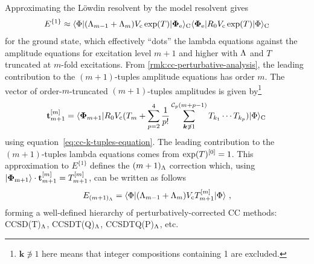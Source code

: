 \documentclass[11pt]{article}
\numberwithin{equation}{section}
\begin{document}
\begin{ex}
Approximating the L\"owdin resolvent by the model resolvent gives
\begin{align}
  E^{\{1\}}
\approx
  \langle\Phi |(\Lambda _{m-1} + \Lambda _m)V_{\mathrm{c}}\,\mathrm{exp}(T)|\mathbf{\Phi }_{\mathrm{e}}\rangle_{\mathrm{C}}
  \langle\mathbf{\Phi }_{\mathrm{e}}|R_0 V_{\mathrm{c}}\,\mathrm{exp}(T)|\Phi \rangle_{\mathrm{C}}
\end{align}
for the ground state, which effectively ``dots'' the lambda equations against the amplitude equations for excitation level $m+1$ and higher with $\Lambda $ and $T$ truncated at $m$-fold excitations.
From \cref{rmk:cc-perturbative-analysis}, the leading contribution to the $(m+1)$-tuples amplitude equations  has order $m$.
The vector of order-$m$-truncated $(m+1)$-tuples amplitudes is given by\footnote{$\bm{k}\not\ni 1$ here means that integer compositions containing 1 are excluded.}
\begin{align}
  \bo{t}_{m+1}\bord{m}
=
  \br{\bo{\F}_{m+1}}R_0
    V_\mr{c}
    (
      T_m
    +
      \sum_{p=2}^4
      \fr{1}{p!}
      \sum_{\bm{k}\not\ni 1}^{\mc{C}_p(m+p-1)}
      T_{k_1}
      \cd
      T_{k_p}
    )
  \kt{\F}_\mr{C}\,
\end{align}
using equation~\ref{eq:cc-k-tuples-equation}.
The leading contribution to the $(m+1)$-tuples lambda equations comes from $\mathrm{exp}(T)^{[0]}= 1$.
This approximation to $E^{\{1\}}$ defines the
$
  (m+1)_{\Lambda }
$
correction
which,
using 
$
  |\mathbf{\Phi }_{\mathrm{m+1}}\rangle\cdot
  \mathbf{t}_{m+1}^{[m]}
=
  T_{m+1}^{[m]}
$, can be written as follows
\begin{align}
  E_{(m+1)_{\Lambda }}
=
  \langle\Phi |(\Lambda _{m-1} + \Lambda _m) V_{\mathrm{c}} T_{m+1}^{[m]}|\Phi \rangle\,\,,
\end{align}
forming a well-defined hierarchy of perturbatively-corrected CC methods:
CCSD(T)$_{\Lambda }$,
CCSDT(Q)$_{\Lambda }$,
CCSDTQ(P)$_{\Lambda }$,
etc.
\end{ex}
\end{document}
